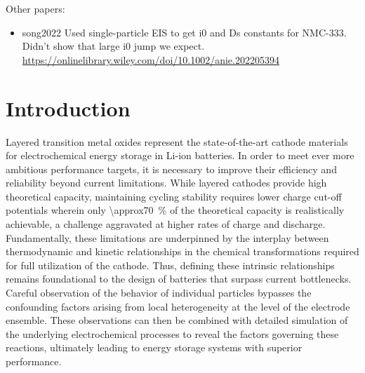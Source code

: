 \documentclass{article}
\begin{document}
Other papers:
\begin{itemize}
\item song2022\cite{song2022} Used single-particle EIS to get i0 and Ds constants for NMC-333. Didn't show that large i0 jump we expect. \url{https://onlinelibrary.wiley.com/doi/10.1002/anie.202205394}
\end{itemize}

\glsresetall{}

\section{Introduction}

Layered transition metal oxides represent the state-of-the-art cathode
materials for electrochemical energy storage in Li-ion batteries. In
order to meet ever more ambitious performance targets, it is necessary
to improve their efficiency and reliability beyond current
limitations. While layered cathodes provide high theoretical capacity,
maintaining cycling stability requires lower charge cut-off potentials
wherein only \SI{\approx70}{\percent} of the theoretical capacity is
realistically achievable, a challenge aggravated at higher rates of
charge and discharge\cite{janek2019-2,chen2020-4}. Fundamentally,
these limitations are underpinned by the interplay between
thermodynamic and kinetic relationships in the chemical
transformations required for full utilization of the cathode. Thus,
defining these intrinsic relationships remains foundational to the
design of batteries that surpass current bottlenecks. Careful
observation of the behavior of individual particles bypasses the
confounding factors arising from local heterogeneity at the level of
the electrode ensemble. These observations can then be combined with
detailed simulation of the underlying electrochemical processes to
reveal the factors governing these reactions, ultimately leading to
energy storage systems with superior performance.

\end{document}

